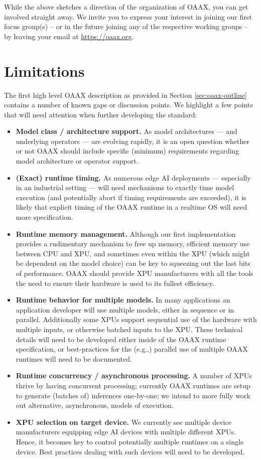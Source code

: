 \documentclass{article}
\newcommand{\oaaxweb}{\href{https://oaax.org}{https://oaax.org}}
\begin{document}
While the above sketches a direction of the organization of OAAX, you can get involved straight away. We invite you to express your interest in joining our first focus group(s) -- or in the future joining any of the respective working groups -- by leaving your email at \oaaxweb.

\section{Limitations}

The first high level OAAX  description as provided in Section \ref{sec:oaax-outline} contains a number of known gaps or discussion points. We highlight a few points that will need attention when further developing the standard:

\begin{itemize}
\item \textbf{Model class / architecture support.} As model architectures --- and underlying operators --- are evolving rapidly, it is an open question whether or not OAAX should include specific (minimum) requirements regarding model architecture or operator support.
\item \textbf{(Exact) runtime timing.} As numerous edge AI deployments --- especially in an industrial setting --- will need mechanisms to exactly time model execution (and potentially abort if timing requirements are exceeded), it is likely that explicit timing of the OAAX runtime in a realtime OS will need more specification.
\item \textbf{Runtime memory management.} Although our first implementation provides a rudimentary mechanism to free up memory, efficient memory use between CPU and XPU, and sometimes even within the XPU (which might be dependent on the model choice) can be key to squeezing out the last bits of performance. OAAX should provide XPU manufacturers with all the tools the need to ensure their hardware is used to its fullest efficiency.
\item \textbf{Runtime behavior for multiple models.} In many applications an application developer will use multiple models, either in sequence or in parallel. Additionally some XPUs support sequential use of the hardware with multiple inputs, or otherwise batched inputs to the XPU. These technical details will need to be developed either inside of the OAAX runtime specification, or best-practices for the (e.g.,) parallel use of multiple OAAX runtimes will need to be documented.
\item \textbf{Runtime concurrency / asynchronous processing.} A number of XPUs thrive by having concurrent processing; currently OAAX runtimes are setup to generate (batches of) inferences one-by-one; we intend to more fully work out alternative, asynchronous, models of execution.
\item \textbf{XPU selection on target device.} We currently see multiple device manufacturers equipping edge AI devices with multiple different XPUs. Hence, it becomes key to control potentially multiple runtimes on a single device. Best practices dealing with such devices will need to be developed.
\end{itemize}
\end{document}
